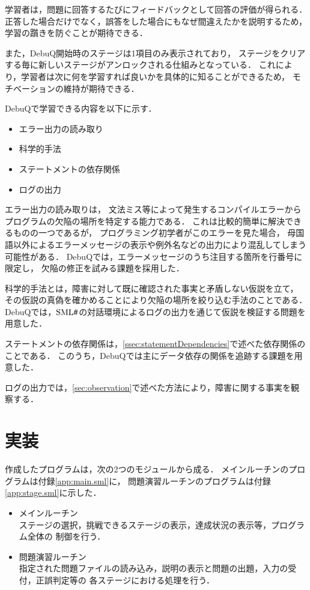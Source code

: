 \documentclass{jreport}
\newcommand\SMLSharp{$\mbox{SML\fontfamily{ptm}\selectfont\#}$}
\begin{document}
学習者は，問題に回答するたびにフィードバックとして回答の評価が得られる．
正答した場合だけでなく，誤答をした場合にもなぜ間違えたかを説明するため，
学習の躓きを防ぐことが期待できる．

また，DebuQ開始時のステージは1項目のみ表示されており，
ステージをクリアする毎に新しいステージがアンロックされる仕組みとなっている．
これにより，学習者は次に何を学習すれば良いかを具体的に知ることができるため，
モチベーションの維持が期待できる．

DebuQで学習できる内容を以下に示す．

\begin{itemize}
  \item エラー出力の読み取り
  \item 科学的手法
  \item ステートメントの依存関係
  \item ログの出力
\end{itemize}

エラー出力の読み取りは，
文法ミス等によって発生するコンパイルエラーからプログラムの欠陥の場所を特定する能力である．
これは比較的簡単に解決できるものの一つであるが，
プログラミング初学者がこのエラーを見た場合，
母国語以外によるエラーメッセージの表示や例外名などの出力により混乱してしまう可能性がある．
DebuQでは，エラーメッセージのうち注目する箇所を行番号に限定し，
欠陥の修正を試みる課題を採用した．

科学的手法とは，障害に対して既に確認された事実と矛盾しない仮説を立て，
その仮説の真偽を確かめることにより欠陥の場所を絞り込む手法のことである．
DebuQでは，\SMLSharp の対話環境によるログの出力を通じて仮説を検証する問題を用意した．

ステートメントの依存関係は，\ref{ssec:statementDependencies}で述べた依存関係のことである．
このうち，DebuQでは主にデータ依存の関係を追跡する課題を用意した．

ログの出力では，\ref{sec:observation}で述べた方法により，障害に関する事実を観察する．

\section{実装}
\label{sec:implement}
作成したプログラムは，次の2つのモジュールから成る．
メインルーチンのプログラムは付録\ref{app:main.sml}に，
問題演習ルーチンのプログラムは付録\ref{app:stage.sml}に示した．

\begin{itemize}
  \item メインルーチン\\
  ステージの選択，挑戦できるステージの表示，達成状況の表示等，プログラム全体の
  制御を行う．
  \item 問題演習ルーチン\\
  指定された問題ファイルの読み込み，説明の表示と問題の出題，入力の受付，正誤判定等の
  各ステージにおける処理を行う．
\end{itemize}
\end{document}
